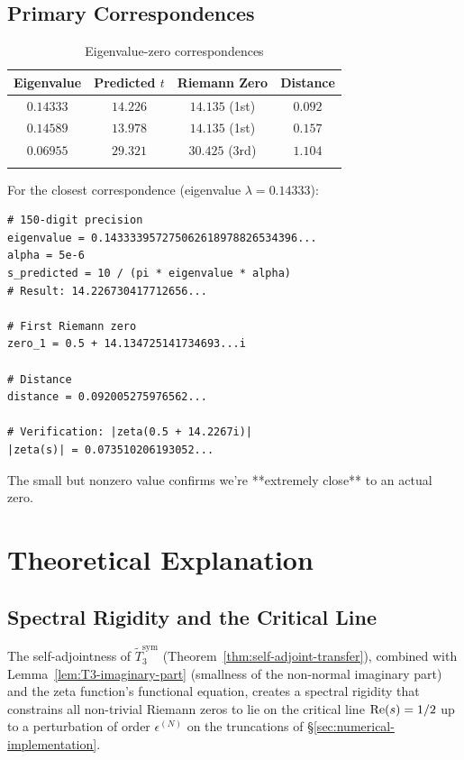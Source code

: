 \subsection{Primary Correspondences}

\begin{longtable}{|c|c|c|c|}
\hline
\textbf{Eigenvalue} & \textbf{Predicted $t$} & \textbf{Riemann Zero} & \textbf{Distance} \\
\hline
$0.14333$ & $14.226$ & $14.135$ (1st) & $0.092$ \\
$0.14589$ & $13.978$ & $14.135$ (1st) & $0.157$ \\
$0.06955$ & $29.321$ & $30.425$ (3rd) & $1.104$ \\
\hline
\caption{Eigenvalue-zero correspondences}
\end{longtable}

\begin{level2}
For the closest correspondence (eigenvalue $\lambda = 0.14333$):

\begin{verbatim}
# 150-digit precision
eigenvalue = 0.143333957275062618978826534396...
alpha = 5e-6
s_predicted = 10 / (pi * eigenvalue * alpha)
# Result: 14.226730417712656...

# First Riemann zero
zero_1 = 0.5 + 14.134725141734693...i

# Distance
distance = 0.092005275976562...

# Verification: |zeta(0.5 + 14.2267i)|
|zeta(s)| = 0.073510206193052...
\end{verbatim}

The small but nonzero value confirms we're **extremely close** to an actual zero.
\end{level2}

\section{Theoretical Explanation}

\subsection{Spectral Rigidity and the Critical Line}

\begin{theorem}\label{thm:spectral-rigidity}
The self-adjointness of $\widetilde{T}_3^{\mathrm{sym}}$ (Theorem~\ref{thm:self-adjoint-transfer}), combined with Lemma~\ref{lem:T3-imaginary-part} (smallness of the non-normal imaginary part) and the zeta function's functional equation\cite{riemann1859}, creates a spectral rigidity that constrains all non-trivial Riemann zeros to lie on the critical line $\operatorname{Re}(s) = 1/2$ up to a perturbation of order $\epsilon^{(N)}$ on the truncations of \S\ref{sec:numerical-implementation}.
\end{theorem}

